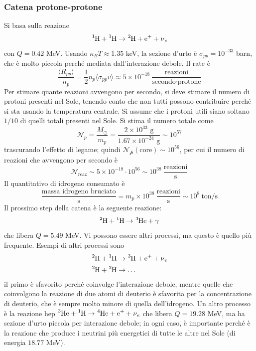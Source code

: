 \documentclass[11pt, a4paper]{scrartcl}
\theoremstyle{style}
\numberwithin{equation}{subsection}
\begin{document}
\subsubsection{Catena protone-protone}
Si basa sulla reazione 
\[
	\ce{^1H + ^1H} \to  \ce{^2H + e+ + \nu_e}
\] 
con $Q = 0.42$ MeV.
Usando $\kappa _B T \approx 1.35$ keV, la sezione d'urto \`e $\sigma _{p p } = 10^{-33}$ barn, che \`e molto piccola perch\'e mediata dall'interazione debole.
Il rate \`e 
\[
\frac{\langle R_{ p p} \rangle }{n_p} = \frac{1}{2} n_p \langle \sigma _{ p p} v \rangle \approx 5 \times 10^{-18}~ \frac{\text{reazioni}}{\text{secondo} \cdot  \text{protone}}
\] 
Per stimare quante reazioni avvengono per secondo, si deve stimare il numero di protoni presenti nel Sole, tenendo conto che non tutti possono contribuire perch\'e si sta usando la temperatura centrale.
Si assume che i protoni utili siano soltano $1 / 10$ di quelli totali presenti nel Sole.
Si stima il numero totale come
\[
\mathcal{N} _p = \frac{M_\odot }{m_p} = \frac{2\times 10^{33} \text{ g}}{1.67\times 10^{-24} \text{ g} } \sim 10^{57}
\] 
trascurando l'effetto di legame; quindi $\mathcal{N_p}  (\text{core}) \sim 10^{56}$, per cui il numero di reazioni che avvengono per secondo \`e 
\[
\mathcal{N} _\text{reaz}\sim 5\times 10^{-18} \cdot 10^{56} \sim 10^{38} ~ \frac{\text{reazioni}}{\text{s}}
\] 
Il quantitativo di idrogeno consumato \`e 
\[
\frac{\text{massa idrogeno bruciato}}{\text{s}} = m_p \times 10^{38} ~ \frac{\text{reazioni}}{\text{s}} \sim 10^{8}~ \text{ton}/\text{s}
\] 
Il prossimo step della catena \`e la seguente reazione:
\[
	\ce{^2H + ^1H} \to \ce{^3He + \gamma}
\] 
che libera $Q = 5.49$ MeV.
Vi possono essere altri processi, ma questo \`e quello pi\`u frequente.
Esempi di altri processi sono
\[
\begin{split}
	&\ce{^2H + ^1H} \to \ce{^3H + e+ + \nu _e}\\
	& \ce{^2H + ^2H} \to  \ldots 
\end{split} 
\] 
il primo \`e sfavorito perch\'e coinvolge l'interazione debole, mentre quelle che coinvolgono la reazione di due atomi di deuterio \`e sfavorita per la concentrazione di deuterio, che \`e sempre molto minore di quella dell'idrogeno.
Un altro processo \`e la reazione hep $\ce{^3He + ^1H}\to \ce{^4He + e+ + \nu _e}$ che libera $Q=19.28$ MeV, ma ha sezione d'urto piccola per interazione debole; in ogni caso, \`e importante perch\'e \`e la reazione che produce i neutrini pi\`u energetici di tutte le altre nel Sole (di energia $18.77$ MeV).
\end{document}

